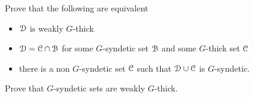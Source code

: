 




\begin{exercise}
  Prove that the following are equivalent
  \begin{itemize}
    \item[1.] $\EuScript D$ is weakly $G$-thick
    \item[2.] $\EuScript D=\EuScript C\cap\EuScript B$ for some $G$-syndetic set $\EuScript B$ and some $G$-thick set $\EuScript C$
    \item[3.] there is a non $G$-syndetic set $\EuScript C$ such that $\EuScript D\cup\EuScript C$ is $G$-syndetic.
  \end{itemize}
\end{exercise}

\begin{exercise}
  Prove that $G$-syndetic sets are weakly $G$-thick.
\end{exercise}


